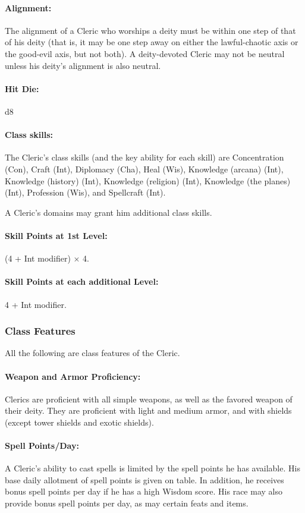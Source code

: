 \paragraph{Alignment:}
The alignment of a Cleric who worships a deity must be within one step of that of his deity  (that is, it may be one step away on either the lawful-chaotic axis or the good-evil axis, but not both). A deity-devoted Cleric may not be neutral unless his deity's alignment is also neutral.
\paragraph{Hit Die:} d8
\paragraph{Class skills:}
The Cleric's class skills (and the key ability for each skill) are 
Concentration (Con), Craft (Int), Diplomacy (Cha), Heal (Wis), Knowledge (arcana) (Int), Knowledge (history) (Int), Knowledge (religion) (Int), Knowledge (the planes) (Int), Profession (Wis), and Spellcraft (Int).

A Cleric's domains may grant him additional class skills.
\paragraph{Skill Points at 1st Level:} (4 + Int modifier) $\times$ 4.
\paragraph{Skill Points at each additional Level:} 4 + Int modifier.

\subsubsection{Class Features}
All the following are class features of the Cleric.

\paragraph{Weapon and Armor Proficiency:} 
Clerics are proficient with all simple weapons, as well as the favored weapon of their deity.
They are proficient with light and medium armor, and with shields (except tower shields and exotic shields).

\paragraph{Spell Points/Day:} 
A Cleric's ability to cast spells is limited by the spell points he has available. 
His base daily allotment of spell points is given on  table. 
In addition, he receives bonus spell points per day if he has a high Wisdom score.
His race may also provide bonus spell points per day, as may certain feats and items.

